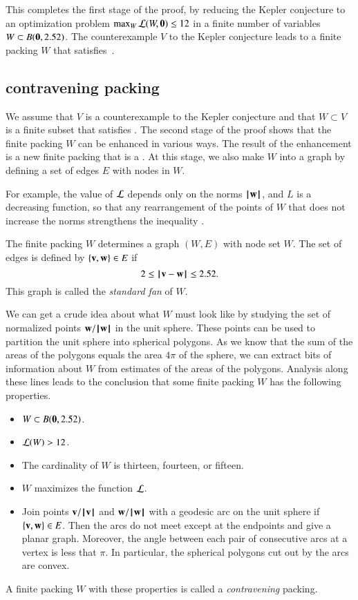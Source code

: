 This completes the first stage of the proof, by reducing the Kepler conjecture to an optimization
problem $\max_W {\mathcal L}(W,{\mathbf 0}) \le 12$ in a finite number of variables $W\subset B({\mathbf 0},2.52)$.
The counterexample $V$ to the Kepler conjecture leads to a finite packing $W$
that satisfies~.

\subsection{contravening packing}

We assume that $V$ is a counterexample to the Kepler conjecture and that $W\subset V$
is a finite subset that satisfies .
The second stage of the proof shows that the 
finite packing $W$ can be enhanced in various ways.  The result of the enhancement is
a new finite packing that is a .  At this stage, we also
make $W$ into a graph by defining a set of edges $E$ with nodes in $W$.

For example, the value of ${\mathcal L}$
depends only on the norms ${{\hskip0.1em|\hskip-0.15em|\hskip0.1em}{\mathbf w}{\hskip0.1em|\hskip-0.15em|\hskip0.1em}}$, and $L$ is a decreasing
function, so that any rearrangement of the points of $W$ that does not
increase the norms strengthens the inequality .

The finite packing $W$ determines a graph $(W,E)$ with node set $W$.  The set
of edges is defined by $\{{\mathbf v},{\mathbf w}\}\in E$ if 
\[2\le\norm{\v}{\w}\le 2.52.\] This graph is called the {\it standard
  fan} of $W$.

We can get a crude idea about what $W$ must look like by studying the
set of normalized points ${\mathbf w}/{{\hskip0.1em|\hskip-0.15em|\hskip0.1em}{\mathbf w}{\hskip0.1em|\hskip-0.15em|\hskip0.1em}}$ in the unit sphere.  These
points can be used to partition the unit sphere into spherical
polygons.  As we know that the sum of the areas of the polygons equals
the area $4\pi$ of the sphere, we can extract bits of information
about $W$ from estimates of the areas of the polygons.  Analysis along
these lines leads to the conclusion that some finite packing $W$
has the following
properties.
\begin{itemize}
\item $W\subset B({\mathbf 0},2.52)$.
\item ${\mathcal L}(W) > 12$.
\item The cardinality of $W$ is thirteen, fourteen, or fifteen.
\item $W$ maximizes the function ${\mathcal L}$.
\item Join points ${\mathbf v}/{{\hskip0.1em|\hskip-0.15em|\hskip0.1em}{\mathbf v}{\hskip0.1em|\hskip-0.15em|\hskip0.1em}}$ and ${\mathbf w}/{{\hskip0.1em|\hskip-0.15em|\hskip0.1em}{\mathbf w}{\hskip0.1em|\hskip-0.15em|\hskip0.1em}}$ with a geodesic arc on the
unit sphere if $\{{\mathbf v},{\mathbf w}\}\in E$.  Then the arcs do not meet except at the endpoints and
give a planar graph.  Moreover, the angle between each pair of consecutive arcs at a vertex is less
that $\pi$.  In particular, the spherical polygons cut out by the arcs are convex.
\end{itemize}
A finite packing $W$ with these properties is called a {\it contravening} packing.


